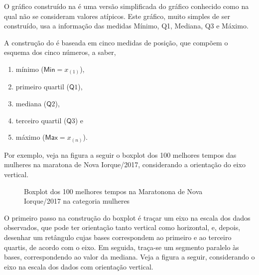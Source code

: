 \label{\detokenize{PE104-6:sec-organizandoasideias3}}\label{\detokenize{PE104-6:organizando-as-ideias-boxplot}}
O gráfico construído na {\hyperref[\detokenize{PE104-6:ativ-construcao-do-boxplot}]{}} é uma versão simplificada do gráfico conhecido como  na qual não se consideram valores atípicos. Este gráfico, muito simples de ser construído, usa a informação das medidas Mínimo, Q1, Mediana, Q3 e Máximo.

A construção do  é baseada em  cinco medidas de posição, que compõem o esquema dos cinco números, a saber,
\begin{enumerate}
\item {} 
mínimo (\(\textsf{Min}=x_{(1)}\)),

\item {} 
primeiro quartil (\(\textsf{Q}1\)),

\item {} 
mediana (\(\textsf{Q}2\)),

\item {} 
terceiro quartil (\(\textsf{Q}3\)) e

\item {} 
máximo (\(\textsf{Max}=x_{(n)}\)).

\end{enumerate}

Por exemplo, veja na figura a seguir o boxplot dos 100 melhores tempos das mulheres na maratona de Nova Iorque/2017, considerando a orientação do  eixo vertical.

\begin{figure}[H]
\centering
\capstart

\noindent{}
\caption{Boxplot dos 100 melhores tempos na Maratonona de Nova Iorque/2017 na categoria mulheres}\label{\detokenize{PE104-6:fig-boxplotmulheres}}\label{\detokenize{PE104-6:id3}}\end{figure}

O primeiro passo na construção do boxplot é traçar um eixo na escala dos dados observados, que pode ter orientação tanto vertical como horizontal, e, depois, desenhar um retângulo cujas bases correspondem ao primeiro e ao terceiro quartis, de acordo com o eixo. Em seguida, traça-se um segmento paralelo às bases, correspondendo ao valor da mediana. Veja a figura a seguir, considerando o eixo na escala dos dados com orientação vertical.

